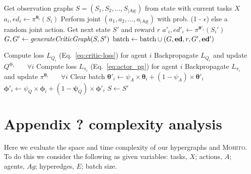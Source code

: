 \documentclass[letterpaper]{article} %
\newcommand{\mohito}{\textsc{Mohito}}
\begin{document}
\begin{algorithm}[!ht]
\caption{\mohito
}
\begin{small}
\begin{algorithmic}[1]
    \State Get observation graphs $S = (S_1, S_2, \ldots, S_{|Ag|})$ from state with current tasks $X$ %
        \State $a_i, ed_i \gets \pi^{\bm{\theta}_i}(S_i)$ 
    \EndFor
    \State Perform joint $(a_1, a_2, \ldots, a_{|Ag|})$ with prob. (1 - $\epsilon$) else a random joint action. Get 
    next state $S'$ and reward $r$ 
        \State $a'_i, ed'_i \gets \pi^{\bm{\theta'}_i}(S_i')$ 
    \EndFor
    \State $G, G' \gets \text{\em{generateCriticGraph}}(S, S')$
    \State $\text{batch} \gets \text{batch}\cup (G, {\bf ed}, r, G', {\bf ed'})$
    
            \State Compute loss $L_{Q_i}$ (Eq.~\ref{eq:critic-loss}) for agent $i$
            \State Backpropagate $L_{Q_i}$ and update $Q^{\bm{\phi}_i}$~~~ $\forall i$
            \State Compute loss $L_{\pi_i}$ (Eq.~\ref{eq:actor_pg}) for agent $i$
            \State Backpropagate $L_{\pi_i}$ and update $\pi^{\bm{\theta}_i}$~~~ $\forall i$
            \State Clear batch
        \EndIf
     \EndWhile
            \State $ \bm{\theta}'_i  \gets \psi_A \times \bm{\theta}_{i} + (1-\psi_A) \times \bm{\theta}'_{i}$
            \State $ \bm{\phi}'_i  \gets \psi_Q \times \bm{\phi}_{i} + (1-\bm{\psi}_Q) \times \bm{\phi}'_{i}$
        \EndFor
        \State $S \gets S'$
\EndFor
\end{algorithmic}
\end{small}
\label{alg:MOHITO}
\end{algorithm}

\section{Appendix ? complexity analysis}

Here we evaluate the space and time complexity of our hypergraphs and \mohito{}. To do this we consider the following as given variables: tasks, $X$; actions, $A$; agents, $Ag$; hyperedges, $E$; batch size.
\end{document}
